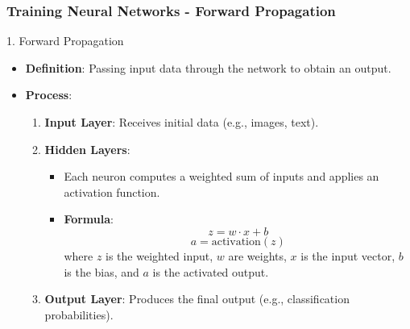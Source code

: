 \documentclass[aspectratio=169]{beamer}
\begin{document}
\begin{frame}[fragile]
    \frametitle{Training Neural Networks - Forward Propagation}
    \begin{block}{1. Forward Propagation}
        \begin{itemize}
            \item \textbf{Definition}: Passing input data through the network to obtain an output.
            \item \textbf{Process}:
            \begin{enumerate}
                \item \textbf{Input Layer}: Receives initial data (e.g., images, text).
                \item \textbf{Hidden Layers}:
                \begin{itemize}
                    \item Each neuron computes a weighted sum of inputs and applies an activation function.
                    \item \textbf{Formula}:
                    \begin{equation}
                        z = w \cdot x + b
                    \end{equation}
                    \begin{equation}
                        a = \text{activation}(z)
                    \end{equation}
                    where \( z \) is the weighted input, \( w \) are weights, \( x \) is the input vector, \( b \) is the bias, and \( a \) is the activated output.
                \end{itemize}
                \item \textbf{Output Layer}: Produces the final output (e.g., classification probabilities).
            \end{enumerate}
        \end{itemize}
    \end{block}
\end{frame}
\end{document}
